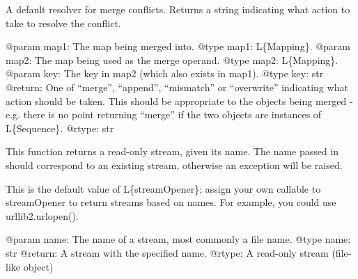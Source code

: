 \documentclass[a4paper,10pt,english]{sphinxmanual}
\begin{document}

\begin{fulllineitems}
\label{\detokenize{apidoc_src/src:src.pyconf.deepCopyMapping}}
\end{fulllineitems}


\begin{fulllineitems}
\label{\detokenize{apidoc_src/src:src.pyconf.defaultMergeResolve}}
A default resolver for merge conflicts. 
Returns a string indicating what action to take to resolve the conflict.

@param map1: The map being merged into.
@type map1: L\{Mapping\}.
@param map2: The map being used as the merge operand.
@type map2: L\{Mapping\}.
@param key: The key in map2 (which also exists in map1).
@type key: str
@return: One of “merge”, “append”, “mismatch” or “overwrite” 
indicating what action should be taken. This should
be appropriate to the objects being merged - e.g.
there is no point returning “merge” if the two objects
are instances of L\{Sequence\}.
@rtype: str

\end{fulllineitems}


\begin{fulllineitems}
\label{\detokenize{apidoc_src/src:src.pyconf.defaultStreamOpener}}
This function returns a read-only stream, given its name. The name passed
in should correspond to an existing stream, otherwise an exception will be
raised.

This is the default value of L\{streamOpener\}; assign your own callable to
streamOpener to return streams based on names. For example, you could use
urllib2.urlopen().

@param name: The name of a stream, most commonly a file name.
@type name: str
@return: A stream with the specified name.
@rtype: A read-only stream (file-like object)

\end{fulllineitems}
\end{document}
